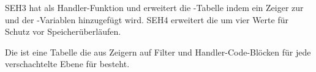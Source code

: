 
SEH3 hat  als Handler-Funktion und erweitert die
-Tabelle indem ein Zeiger zur  und
der -Variablen hinzugefügt wird.
SEH4 erweitert die  um vier Werte für Schutz vor Speicherüberläufen.

Die  ist eine Tabelle die aus Zeigern auf Filter und Handler-Code-Blöcken
für jede verschachtelte Ebene für  besteht.



%
%
%
%
%
%
%
